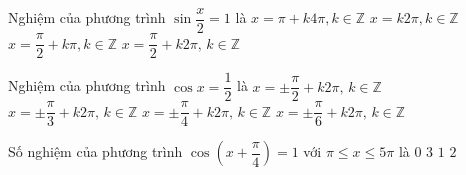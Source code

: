 \begin{ex}%
	Nghiệm của phương trình $\sin \dfrac{x}{2}=1$ là
	\choice
	{\True $x=\pi +k4\pi,k\in \mathbb{Z}$}
	{$x=k2\pi,k\in \mathbb{Z}$}
	{$x=\dfrac{\pi}{2} +k\pi,k\in \mathbb{Z}$}
	{$x=\dfrac{\pi}{2}+k2\pi,\, k\in \mathbb{Z}$}
\end{ex}
\begin{ex}%
	Nghiệm của phương trình $\cos x=\dfrac{1}{2}$ là
	\choice
	{$x=\pm \dfrac{\pi}{2}+k2\pi,\, k\in \mathbb{Z} $}
	{\True $x=\pm \dfrac{\pi}{3}+k2\pi,\, k\in \mathbb{Z} $}
	{$x=\pm \dfrac{\pi}{4}+k2\pi ,\, k\in \mathbb{Z}$}
	{$x=\pm \dfrac{\pi}{6}+k2\pi,\, k\in \mathbb{Z} $}
	\loigiai{
		Ta có $\cos x=\cos \dfrac{\pi}{3}\Leftrightarrow \left[\begin{matrix}
			x=\dfrac{\pi}{3}+k2\pi \\
			x=-\dfrac{\pi}{3}+k2\pi \\
		\end{matrix}\right.\left(k\in \mathbb{Z}\right)$.}
\end{ex}
\begin{ex}%
	Số nghiệm của phương trình $\cos \left(x+\dfrac{\pi}{4}\right)=1$ với $\pi \le x\le 5\pi $ là
	\choice
	{$0$}
	{$3$}
	{$1$}
	{\True $2$}
\end{ex}

